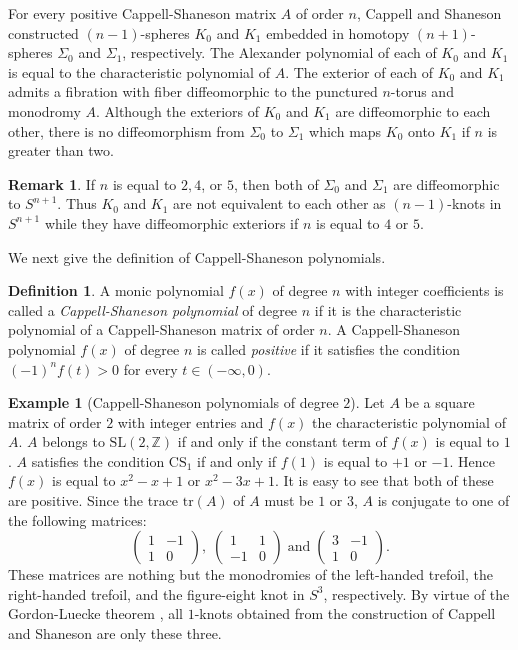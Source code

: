 \documentclass{amsart}
\theoremstyle{plain}
\theoremstyle{definition}
\newtheorem{defn}[thm]{Definition}
\newtheorem{exmp}[thm]{Example}
\newtheorem{rem}[thm]{Remark}
\theoremstyle{remark}
\begin{document}
For every positive Cappell-Shaneson matrix $A$ of order $n$, 
Cappell and Shaneson \cite{CS1976} constructed $(n-1)$-spheres $K_0$ and $K_1$ embedded 
in homotopy $(n+1)$-spheres $\Sigma_0$ and $\Sigma_1$, respectively. 
The Alexander polynomial of each of $K_0$ and $K_1$ 
is equal to the characteristic polynomial of $A$. The exterior of each of $K_0$ and $K_1$ 
admits a fibration with fiber diffeomorphic to the punctured $n$-torus and monodromy $A$. 
Although the exteriors of $K_0$ and $K_1$ are diffeomorphic to each other, 
there is no diffeomorphism from $\Sigma_0$ to $\Sigma_1$ which maps $K_0$ onto $K_1$ 
if $n$ is greater than two. 

\begin{rem}
If $n$ is equal to $2,4$, or $5$, then both of $\Sigma_0$ and $\Sigma_1$ are diffeomorphic to 
$S^{n+1}$. Thus $K_0$ and $K_1$ are not equivalent to each other 
as $(n-1)$-knots in $S^{n+1}$ while they have 
diffeomorphic exteriors if $n$ is equal to $4$ or $5$. 
\end{rem}

We next give the definition of Cappell-Shaneson polynomials. 

\begin{defn}
A monic polynomial $f(x)$ of degree $n$ with integer coefficients is called 
a {\it Cappell-Shaneson polynomial} of degree $n$ if it is the characteristic polynomial of 
a Cappell-Shaneson matrix of order $n$. 
A Cappell-Shaneson polynomial $f(x)$ of degree $n$ is called {\it positive} 
if it satisfies the condition $(-1)^nf(t)>0$ for every $t\in (-\infty,0)$. 
\end{defn}

\begin{exmp}[Cappell-Shaneson polynomials of degree $2$]
Let $A$ be a square matrix of order $2$ with integer entries and $f(x)$ the characteristic polynomial of $A$. 
$A$ belongs to $\mathrm{SL}(2,\mathbb{Z})$ if and only if the constant term of $f(x)$ is equal to $1$. 
$A$ satisfies the condition $\mathrm{CS}_1$ if and only if $f(1)$ is equal to $+1$ or $-1$. 
Hence $f(x)$ is equal to $x^2-x+1$ or $x^2-3x+1$. 
It is easy to see that both of these are positive. 
Since the trace $\mathrm{tr}(A)$ of $A$ must be $1$ or $3$, $A$ is conjugate to one of the 
following matrices: 
\[ 
\left(
\begin{array}{rr}
1 & -1 \\
1 & 0
\end{array}
\right), 
\; 
\left(
\begin{array}{rr}
1 & 1 \\
-1 & 0
\end{array}
\right)
\; 
\textrm{and} 
\;
\left(
\begin{array}{rr}
3 & -1 \\
1 & 0
\end{array}
\right).
\]
These matrices are nothing but the monodromies of the left-handed trefoil, the right-handed trefoil, 
and the figure-eight knot in $S^3$, respectively. 
By virtue of the Gordon-Luecke theorem \cite{GL1989}, 
all $1$-knots obtained from the construction of Cappell and Shaneson \cite{CS1976} are only these three. 
\end{exmp}
\end{document}
